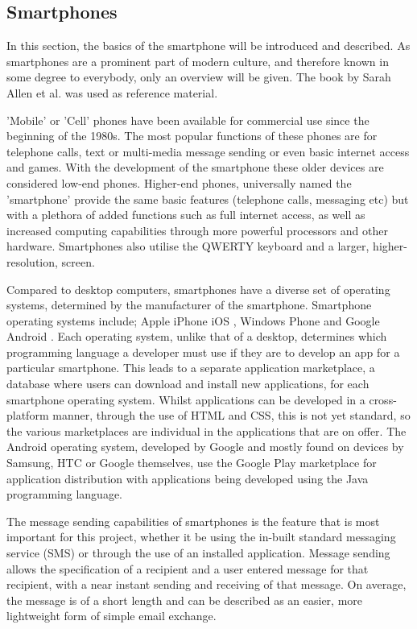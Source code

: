 \documentclass[a4paper,10pt]{report}
\begin{document}
\subsection{Smartphones}

In this section, the basics of the smartphone will be introduced and described. As smartphones are a prominent part of modern culture, and therefore known in some degree to everybody, only an overview will be given. The book by Sarah Allen et al. \cite{whatisasmartphone} was used as reference material.

'Mobile' or 'Cell' phones have been available for commercial use since the beginning of the 1980s. The most popular functions of these phones are for telephone calls, text or multi-media message sending or even basic internet access and games. With the development of the smartphone these older devices are considered low-end phones. Higher-end phones, universally named the 'smartphone' provide the same basic features (telephone calls, messaging etc) but with a plethora of added functions such as full internet access, as well as increased computing capabilities through more powerful processors and other hardware. Smartphones also utilise the QWERTY keyboard and a larger, higher-resolution, screen. 

Compared to desktop computers, smartphones have a diverse set of operating systems, determined by the manufacturer of the smartphone. Smartphone operating systems include; Apple iPhone iOS \cite{appleios}, Windows Phone \cite{windowsphone} and Google Android \cite{googleandroid}. Each operating system, unlike that of a desktop, determines which programming language a developer must use if they are to develop an app for a particular smartphone. This leads to a separate application marketplace, a database where users can download and install new applications, for each smartphone operating system. Whilst applications can be developed in a cross-platform manner, through the use of HTML and CSS, this is not yet standard, so the various marketplaces are individual in the applications that are on offer. The Android operating system, developed by Google and mostly found on devices by Samsung, HTC or Google themselves, use the Google Play marketplace \cite{googleplay} for application distribution with applications being developed using the Java programming language.

The message sending capabilities of smartphones is the feature that is most important for this project, whether it be using the in-built standard messaging service (SMS) or through the use of an installed application. Message sending allows the specification of a recipient and a user entered message for that recipient, with a near instant sending and receiving of that message. On average, the message is of a short length and can be described as an easier, more lightweight form of simple email exchange. 
\end{document}
